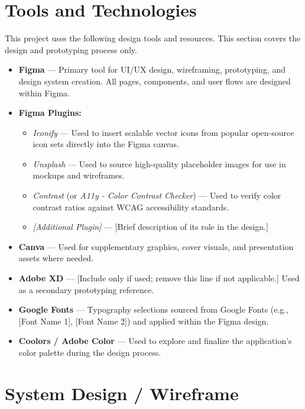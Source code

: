 \documentclass[12pt, a4paper]{article}
\begin{document}
\section{Tools and Technologies}

This project uses the following design tools and resources. This section covers the design and prototyping process only.

\begin{itemize}
    \item \textbf{Figma} --- Primary tool for UI/UX design, wireframing, prototyping, and design system creation. All pages, components, and user flows are designed within Figma.
    \item \textbf{Figma Plugins:}
        \begin{itemize}
            \item \textit{Iconify} --- Used to insert scalable vector icons from popular open-source icon sets directly into the Figma canvas.
            \item \textit{Unsplash} --- Used to source high-quality placeholder images for use in mockups and wireframes.
            \item \textit{Contrast} (or \textit{A11y - Color Contrast Checker}) --- Used to verify color contrast ratios against WCAG accessibility standards.
            \item \textit{[Additional Plugin]} --- [Brief description of its role in the design.]
        \end{itemize}
    \item \textbf{Canva} --- Used for supplementary graphics, cover visuals, and presentation assets where needed.
    \item \textbf{Adobe XD} --- [Include only if used; remove this line if not applicable.] Used as a secondary prototyping reference.
    \item \textbf{Google Fonts} --- Typography selections sourced from Google Fonts (e.g., [Font Name 1], [Font Name 2]) and applied within the Figma design.
    \item \textbf{Coolors / Adobe Color} --- Used to explore and finalize the application's color palette during the design process.
\end{itemize}

\section{System Design / Wireframe}
\end{document}
